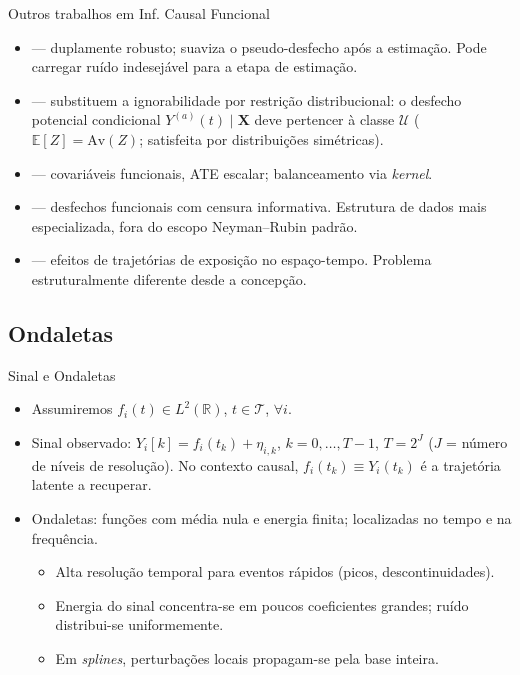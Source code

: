 \documentclass{beamer}
\begin{document}
\begin{frame}{Outros trabalhos em Inf. Causal Funcional}
\begin{itemize}
    \item {} — duplamente robusto; suaviza o pseudo-desfecho após a estimação. Pode carregar ruído indesejável para a etapa de estimação.
    \item {} — substituem a ignorabilidade por restrição distribucional: o desfecho potencial condicional \(Y^{(a)}(t)\mid\mathbf{X}\) deve pertencer à classe \(\mathcal{U}\) (\(\mathbb{E}[Z] = \mathrm{Av}(Z)\); satisfeita por distribuições simétricas).
    \item {} — covariáveis funcionais, ATE escalar; balanceamento via \textit{kernel}.
    \item {} — desfechos funcionais com censura informativa. Estrutura de dados mais especializada, fora do escopo Neyman--Rubin padrão.
    \item {} — efeitos de trajetórias de exposição no espaço-tempo. Problema estruturalmente diferente desde a concepção.
\end{itemize}
\end{frame}

\subsection{Ondaletas}

\begin{frame}{Sinal e Ondaletas}
\begin{itemize}
    \item Assumiremos \(f_i(t) \in L^{2}(\mathbb{R})\), \(t \in \mathcal{T}\), \(\forall i\).
    \item Sinal observado: \(Y_i[k] = f_i(t_k) + \eta_{i,k}\), \(k=0,\ldots,T{-}1\), \(T = 2^J\) (\(J\) = número de níveis de resolução). No contexto causal, \(f_i(t_k) \equiv Y_i(t_k)\) é a trajetória latente a recuperar.
    \item Ondaletas: funções com média nula e energia finita; localizadas no tempo e na frequência.
    \begin{itemize}
        \item Alta resolução temporal para eventos rápidos (picos, descontinuidades).
        \item Energia do sinal concentra-se em poucos coeficientes grandes; ruído distribui-se uniformemente.
        \item Em \textit{splines}, perturbações locais propagam-se pela base inteira.
    \end{itemize}
\end{itemize}
\end{frame}
\end{document}
